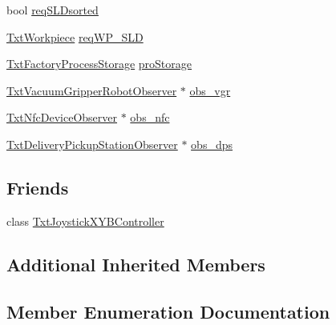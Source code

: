 \begin{DoxyCompactItemize}
bool \hyperlink{classft_1_1_txt_vacuum_gripper_robot_abf93cd1bdac879e296b0ccf4417792d2}{req\+S\+L\+Dsorted}
\item 
\hyperlink{classft_1_1_txt_workpiece}{Txt\+Workpiece} \hyperlink{classft_1_1_txt_vacuum_gripper_robot_ada2de53763edfcfa88e373f22107dce3}{req\+W\+P\+\_\+\+S\+LD}
\item 
\hyperlink{classft_1_1_txt_factory_process_storage}{Txt\+Factory\+Process\+Storage} \hyperlink{classft_1_1_txt_vacuum_gripper_robot_a7c31313dda4d0afd1b2419796cc1355b}{pro\+Storage}
\item 
\hyperlink{classft_1_1_txt_vacuum_gripper_robot_observer}{Txt\+Vacuum\+Gripper\+Robot\+Observer} $\ast$ \hyperlink{classft_1_1_txt_vacuum_gripper_robot_a402021c1d365f1814532d0b723ae80cc}{obs\+\_\+vgr}
\item 
\hyperlink{classft_1_1_txt_nfc_device_observer}{Txt\+Nfc\+Device\+Observer} $\ast$ \hyperlink{classft_1_1_txt_vacuum_gripper_robot_aa665dee69141ec5bb70bc542858f3a1c}{obs\+\_\+nfc}
\item 
\hyperlink{classft_1_1_txt_delivery_pickup_station_observer}{Txt\+Delivery\+Pickup\+Station\+Observer} $\ast$ \hyperlink{classft_1_1_txt_vacuum_gripper_robot_ae46228a9937f65dd44075200736230ec}{obs\+\_\+dps}
\end{DoxyCompactItemize}
\subsection*{Friends}
\begin{DoxyCompactItemize}
\item 
class \hyperlink{classft_1_1_txt_vacuum_gripper_robot_a23c350af40fe2a0866b409315c4dfe1a}{Txt\+Joystick\+X\+Y\+B\+Controller}
\end{DoxyCompactItemize}
\subsection*{Additional Inherited Members}


\subsection{Member Enumeration Documentation}
